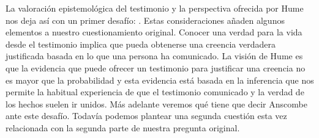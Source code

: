 La valoración epistemológica del testimonio y la perspectiva ofrecida por Hume
nos deja así con un primer desafío: .\autocite[294]{prades2015testimonio} Estas consideraciones añaden
algunos elementos a nuestro cuestionamiento original. Conocer una verdad para la
vida desde el testimonio implica que pueda obtenerse una creencia verdadera
justificada basada en lo que una persona ha comunicado. La visión de Hume es que
la evidencia que puede ofrecer un testimonio para justificar una creencia no es
mayor que la probabilidad y esta evidencia está basada en la inferencia que nos
permite la habitual experiencia de que el testimonio comunicado y la verdad de
los hechos suelen ir unidos. Más adelante veremos qué tiene que decir Anscombe
ante este desafío. Todavía podemos plantear una segunda cuestión esta vez
relacionada con la segunda parte de nuestra pregunta original.

